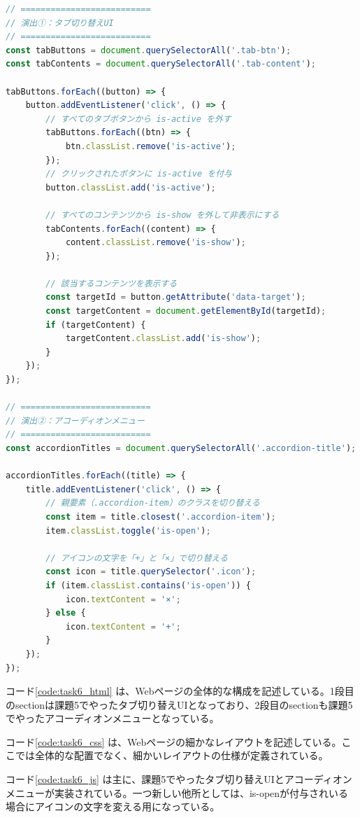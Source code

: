 \documentclass[a4paper,11pt]{jlreq}
\begin{document}
\begin{lstlisting}[language=JavaScript, caption={課題6のjs}, label={code:task6_js}]
// ==========================
// 演出①：タブ切り替えUI
// ==========================
const tabButtons = document.querySelectorAll('.tab-btn');
const tabContents = document.querySelectorAll('.tab-content');

tabButtons.forEach((button) => {
    button.addEventListener('click', () => {
        // すべてのタブボタンから is-active を外す
        tabButtons.forEach((btn) => {
            btn.classList.remove('is-active');
        });
        // クリックされたボタンに is-active を付与
        button.classList.add('is-active');

        // すべてのコンテンツから is-show を外して非表示にする
        tabContents.forEach((content) => {
            content.classList.remove('is-show');
        });

        // 該当するコンテンツを表示する
        const targetId = button.getAttribute('data-target');
        const targetContent = document.getElementById(targetId);
        if (targetContent) {
            targetContent.classList.add('is-show');
        }
    });
});

// ==========================
// 演出②：アコーディオンメニュー
// ==========================
const accordionTitles = document.querySelectorAll('.accordion-title');

accordionTitles.forEach((title) => {
    title.addEventListener('click', () => {
        // 親要素（.accordion-item）のクラスを切り替える
        const item = title.closest('.accordion-item');
        item.classList.toggle('is-open');

        // アイコンの文字を「+」と「×」で切り替える
        const icon = title.querySelector('.icon');
        if (item.classList.contains('is-open')) {
            icon.textContent = '×';
        } else {
            icon.textContent = '+';
        }
    });
});
\end{lstlisting}

コード\ref{code:task6_html} は、Webページの全体的な構成を記述している。1段目のsectionは課題5でやったタブ切り替えUIとなっており、2段目のsectionも課題5でやったアコーディオンメニューとなっている。

コード\ref{code:task6_css} は、Webページの細かなレイアウトを記述している。ここでは全体的な配置でなく、細かいレイアウトの仕様が定義されている。

コード\ref{code:task6_js} は主に、課題5でやったタブ切り替えUIとアコーディオンメニューが実装されている。一つ新しい他所としては、is-openが付与されいる場合にアイコンの文字を変える用になっている。
\end{document}
